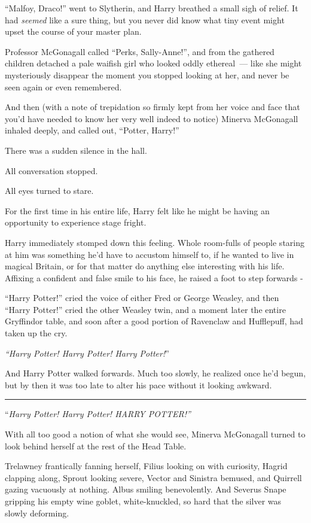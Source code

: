 ``Malfoy, Draco!'' went to Slytherin, and Harry breathed a small sigh of relief. It had \emph{seemed} like a sure thing, but you never did know what tiny event might upset the course of your master plan.

Professor McGonagall called ``Perks, Sally-Anne!'', and from the gathered children detached a pale waifish girl who looked oddly ethereal~--- like she might mysteriously disappear the moment you stopped looking at her, and never be seen again or even remembered.

And then (with a note of trepidation so firmly kept from her voice and face that you'd have needed to know her very well indeed to notice) Minerva McGonagall inhaled deeply, and called out, ``Potter, Harry!''

There was a sudden silence in the hall.

All conversation stopped.

All eyes turned to stare.

For the first time in his entire life, Harry felt like he might be having an opportunity to experience stage fright.

Harry immediately stomped down this feeling. Whole room-fulls of people staring at him was something he'd have to accustom himself to, if he wanted to live in magical Britain, or for that matter do anything else interesting with his life. Affixing a confident and false smile to his face, he raised a foot to step forwards -

``Harry Potter!'' cried the voice of either Fred or George Weasley, and then ``Harry Potter!'' cried the other Weasley twin, and a moment later the entire Gryffindor table, and soon after a good portion of Ravenclaw and Hufflepuff, had taken up the cry.

\emph{``Harry Potter! Harry Potter! Harry Potter!}''

And Harry Potter walked forwards. Much too slowly, he realized once he'd begun, but by then it was too late to alter his pace without it looking awkward.

\begin{center}\rule{3in}{0.4pt}\end{center}

``\emph{Harry Potter! Harry Potter! HARRY POTTER!''}

With all too good a notion of what she would see, Minerva McGonagall turned to look behind herself at the rest of the Head Table.

Trelawney frantically fanning herself, Filius looking on with curiosity, Hagrid clapping along, Sprout looking severe, Vector and Sinistra bemused, and Quirrell gazing vacuously at nothing. Albus smiling benevolently. And Severus Snape gripping his empty wine goblet, white-knuckled, so hard that the silver was slowly deforming.

